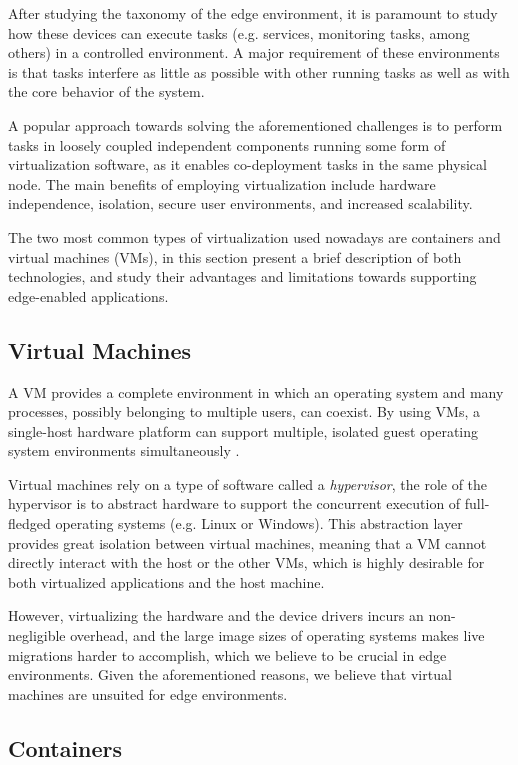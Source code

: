 
After studying the taxonomy of the edge environment, it is paramount to study how these devices can execute tasks (e.g. services, monitoring tasks, among others) in a controlled environment. A major requirement of these environments is that tasks interfere as little as possible with other running tasks as well as with the core behavior of the system.

A popular approach towards solving the aforementioned challenges is to perform tasks in loosely coupled independent components running some form of virtualization software, as it enables co-deployment tasks in the same physical node. The main benefits of employing virtualization include hardware independence, isolation, secure user environments, and increased scalability. 

The two most common types of virtualization used nowadays are containers and virtual machines (VMs), in this section present a brief description of both technologies, and study their advantages and limitations towards supporting edge-enabled applications.

\subsection{Virtual Machines}

A VM provides a complete environment in which an operating system and many processes, possibly belonging to multiple users, can coexist. By using VMs, a single-host hardware platform can support multiple, isolated guest operating system environments simultaneously \cite{1430629}. 

Virtual machines rely on a type of software called a \textit{hypervisor}, the role of the hypervisor is to abstract hardware to support the concurrent execution of full-fledged operating systems (e.g. Linux or Windows). This abstraction layer provides great isolation between virtual machines, meaning that a VM cannot directly interact with the host or the other VMs, which is highly desirable for both virtualized applications and the host machine. 

However, virtualizing the hardware and the device drivers incurs an non-negligible overhead, and the large image sizes of operating systems makes live migrations harder to accomplish, which we believe to be crucial in edge environments. Given the aforementioned reasons, we believe that virtual machines are unsuited for edge environments.

\subsection{Containers}

